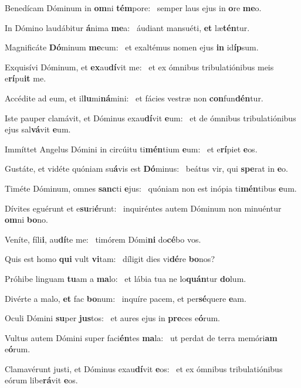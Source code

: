 \item Benedícam Dóminum in \textbf{om}ni \textbf{tém}pore:~\psstar{} semper laus ejus in \textbf{o}re \textbf{me}o.
\item In Dómino laudábitur \textbf{á}nima \textbf{me}a:~\psstar{} áudiant mansuéti, \textbf{et} læ\textbf{tén}tur.
\item Magnificáte \textbf{Dó}minum \textbf{me}\-cum:~\psstar{} et exaltémus nomen ejus \textbf{in} id\textbf{íp}sum.
\item Exquisívi Dóminum, et \textbf{ex}au\textbf{dí}vit me:~\psstar{} et ex ómnibus tribulatiónibus meis e\textbf{rí}pu\textbf{it} me.
\item Accédite ad eum, et il\textbf{lu}mi\textbf{ná}mini:~\psstar{} et fácies vestræ non \textbf{con}fun\textbf{dén}tur.
\item Iste pauper clamávit, et Dóminus exau\textbf{dí}vit \textbf{e}um:~\psstar{} et de ómnibus tribulatiónibus ejus sal\textbf{vá}vit \textbf{e}um.
\item Immíttet Angelus Dómini in circúitu ti\textbf{mén}tium \textbf{e}um:~\psstar{} et e\textbf{rí}piet \textbf{e}os.
\item Gustáte, et vidéte quóniam su\textbf{á}vis est \textbf{Dó}minus:~\psstar{} beátus vir, qui \textbf{spe}rat in \textbf{e}o.
\item Timéte Dóminum, omnes \textbf{sanc}ti \textbf{e}jus:~\psstar{} quóniam non est inópia ti\textbf{mén}tibus \textbf{e}um.
\item Dívites eguérunt et e\textbf{su}ri\textbf{é}\-runt:~\psstar{} inquiréntes autem Dóminum non minuéntur \textbf{om}ni \textbf{bo}no.
\item Veníte, fíli\textbf{i}, au\textbf{dí}te me:~\psstar{} timórem Dómi\textbf{ni} do\textbf{cé}bo vos.
\item Quis est homo \textbf{qui} vult \textbf{vi}tam:~\psstar{} díligit dies vi\textbf{dé}re \textbf{bo}nos?
\item Próhibe linguam \textbf{tu}am a \textbf{ma}lo:~\psstar{} et lábia tua ne lo\textbf{quán}tur \textbf{do}lum.
\item Divérte a malo, \textbf{et} fac \textbf{bo}num:~\psstar{} inquíre pacem, et per\textbf{sé}quere \textbf{e}am.
\item Oculi Dómini \textbf{su}per \textbf{jus}tos:~\psstar{} et aures ejus in \textbf{pre}ces e\textbf{ó}rum.
\item Vultus autem Dómini super faci\textbf{én}tes \textbf{ma}la:~\psstar{} ut perdat de terra memóri\textbf{am} e\textbf{ó}rum.
\item Clamavérunt justi, et Dóminus exau\textbf{dí}vit \textbf{e}os:~\psstar{} et ex ómnibus tribulatiónibus eórum libe\textbf{rá}vit \textbf{e}os.
